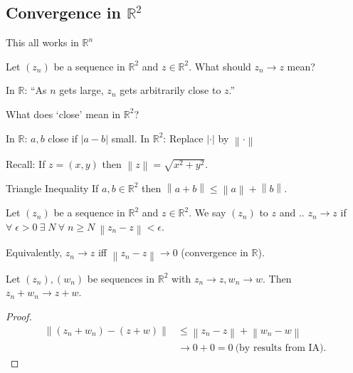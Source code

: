     \subsection{Convergence in $\mathbb{R}^2$}
    \begin{remark}
        This all works in $\mathbb{R}^n$
    \end{remark} 

    Let $(z_n)$ be a sequence in $\mathbb{R}^2$ and $z \in \mathbb{R}^2$.
    What should $z_n \to z$ mean?

    In $\mathbb{R}$: ``As $n$ gets large, $z_n$ gets arbitrarily close to $z$.''

    What does `close' mean in $\mathbb{R}^2$?

    In $\mathbb{R}$: $a, b$ close if $|a - b|$ small.
    In $\mathbb{R}^2$: Replace $|\cdot|$ by $\left \lVert \cdot \right \rVert $

    Recall: If $z = (x, y)$ then $\left \lVert z \right \rVert = \sqrt{x^2 + y^2}$.

    Triangle Inequality If $a, b \in \mathbb{R}^2$ then $\left \lVert a + b \right \rVert \leq \left \lVert a \right \rVert + \left \lVert b \right \rVert$.

    \begin{definition}
        Let $(z_n)$ be a sequence in $\mathbb{R}^2$ and $z \in \mathbb{R}^2$.
        We say $(z_n)$  to $z$ and .. $z_n \to z$ if $\forall \; \epsilon > 0 \ \exists \; N \ \forall \; n \geq N \ \left \lVert z_n - z \right \rVert < \epsilon$. 

        Equivalently, $z_n \to z$ iff $\left \lVert z_n - z \right \rVert \to 0$ (convergence in $\mathbb{R}$).
    \end{definition} 

    \begin{example}
        Let $(z_n), (w_n)$ be sequences in $\mathbb{R}^2$ with $z_n \to z, w_n \to w$. 
        Then $z_n + w_n \to z + w$.
    \end{example} 

    \begin{proof}
        \begin{align*}
            \left \lVert (z_n + w_n) - (z + w) \right \rVert &\leq \left \lVert z_n - z \right \rVert + \left \lVert w_n - w \right \rVert \\
            &\to 0 + 0 = 0 \ \text{(by results from IA)}.
        \end{align*} 
    \end{proof} 

